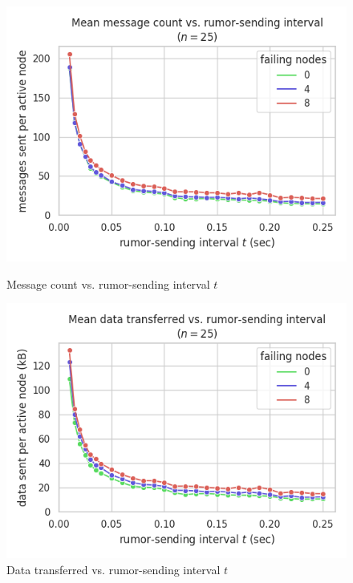 \begin{figure}[H]
    \centering
    \begin{minipage}{0.5\textwidth}
        \centering
        \includegraphics[width=\textwidth]{figures/6/bandwidth_msg_tx_sum_by_gossip_tick.png}
        \captionsetup{labelformat=empty}
        \caption{Message count vs. rumor-sending interval $t$}
    \end{minipage}\hfill
    \begin{minipage}{0.5\textwidth}
        \centering
        \includegraphics[width=\textwidth]{figures/6/bandwidth_tx_sum_by_gossip_tick.png}
        \captionsetup{labelformat=empty}
        \caption{Data transferred vs. rumor-sending interval $t$}
    \end{minipage}\hfill
\end{figure}


